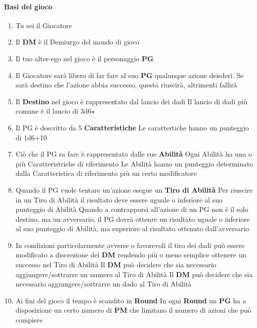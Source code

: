 \documentclass[10pt,a4paper]{report}
\begin{document}
\paragraph{Basi del gioco} 
\begin{enumerate}
\item{Tu} sei il Giocatore
\item Il \textbf{DM} è il Demiurgo del mondo di gioco
\item Il tuo alter-ego nel gioco è il personaggio \textbf{PG}
\item Il Giocatore sarà libero di far fare al suo \textbf{PG} qualunque azione deisderi. Se sarà destino che l'azione abbia successo, questa riuscirà, altrimenti fallirà
\item Il \textbf{Destino} nel gioco è rappresentato dal lancio dei dadi
\subitem Il lancio di dadi più comune è il lancio di 3d6$\star$
\item Il PG è descritto da 5 \textbf{Caratteristiche}
\subitem Le carattertiche hanno un punteggio di 1d6+10
\item Ciò che il PG sa fare è rappresentato dalle sue \textbf{Abilità}
\subitem Ogni Abilità ha una o più Caratteristriche di riferimento
\subitem Le Abilità hanno un punteggio determinato dalla Caratteristica di riferimento più un certo modificatore
\item Quando il PG vuole tentare un'azione esegue un \textbf{Tiro di Abilità}
\subitem Per riuscire in un Tiro di Abilità il risultato deve essere uguale o inferiore al suo punteggio di Abilità
\subitem Quando a contrapporsi all'azione di un PG non è il solo destino, ma un avversario, il PG dovrà ottenre un risultato uguale o inferiore al suo punteggio di Abilità, ma superiore al risultato ottenuto dall'avversario
\item In condizioni particolarmente avverse o favorevoli il tiro dei dadi può essere modificato a discrezione del \textbf{DM} rendendo più o meno semplice ottenere un successo nel Tiro di Abilità
\subitem Il \textbf{DM} può decidere che sia necessario aggiungere/sottrarre un numero al Tiro di Abilità
\subitem Il \textbf{DM} può decidere che sia necessario aggiungere/sottrarre un dado al Tiro di Abilità
\item Ai fini del gioco il tempo è scandito in \textbf{Round}
\subitem In ogni \textbf{Round} un \textbf{PG} ha a disposizione un certo numero di \textbf{PM} che limitano il numero di azioni che può compiere


\end{enumerate}
\end{document}

